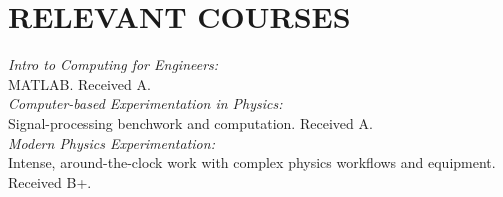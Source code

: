 \documentclass{article}
\begin{document}
\section*{RELEVANT COURSES}
{\it Intro to Computing for Engineers:} \\
  MATLAB. Received A. \\[0.2em]
{\it Computer-based Experimentation in Physics:} \\
  Signal-processing benchwork and computation. Received A. \\[0.2em]
{\it Modern Physics Experimentation:} \\
  Intense, around-the-clock work with complex physics workflows and equipment. Received B+.
\end{document}
